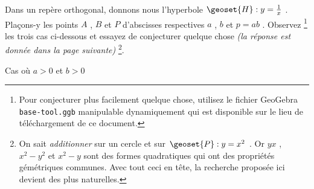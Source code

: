 Dans un repère orthogonal, donnons nous l'hyperbole $\geoset{H} : y = \frac{1}{x}$ . Plaçons-y les points $A$ , $B$ et $P$ d'abscisses respectives $a$ , $b$ et  $p = ab$ .
Observez
\footnote{
	Pour conjecturer plus facilement quelque chose, utilisez le fichier GeoGebra \texttt{base-tool.ggb} manipulable dynamiquement qui est disponible sur le lieu de téléchargement de ce document.
}
les trois cas ci-dessous et essayez de conjecturer quelque chose \emph{(la réponse est donnée dans la page suivante)}
\footnote{
	On sait \emph{\og additionner \fg} sur un cercle et sur $\geoset{P} : y = x^2$ .
	Or $yx$ , $x^2 - y^2$ et $x^2 - y$ sont des formes quadratiques qui ont des propriétés gémétriques communes.
	Avec tout ceci en tête, la recherche proposée ici devient des plus naturelles.
}.


\begin{center}
	\footnotesize
	\itshape

	
	\smallskip
	Cas où $a > 0$ et $b > 0$

	\medskip
	
	

\end{center}
